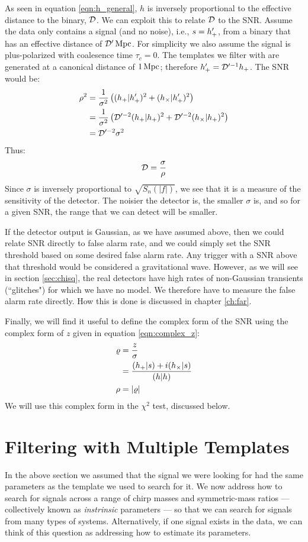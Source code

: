 As seen in equation \ref{eqn:h_general}, $h$ is inversely proportional to the effective distance to the binary, $\mathcal{D}$. We can exploit this to relate $\mathcal{D}$ to the \ac{SNR}. Assume the data only contains a signal (and no noise), i.e., $s = h'_{+}$, from a binary that has an effective distance of $\mathcal{D}'\,\mathrm{Mpc}$. For simplicity we also assume the signal is plus-polarized with coalesence time $\tau_c = 0$. The templates we filter with are generated at a canonical distance of $1\,\mathrm{Mpc}$; therefore $h'_{+} = \mathcal{D}'^{-1}h_{+}$. The \ac{SNR} would be:
\begin{align*}
\rho^2 &= \frac{1}{\sigma^2}\left( (h_{+}|h'_{+})^2 + (h_{\times}|h'_{+})^2 \right) \\
 &= \frac{1}{\sigma^2} \left( \mathcal{D}'^{-2}(h_{+}|h_{+})^2 + \mathcal{D}'^{-2}(h_{\times}|h_{+})^2 \right) \\
 &= \mathcal{D}'^{-2} \sigma^2
\end{align*}
Thus:
\begin{equation}
\label{eqn:DtoRho}
\effD = \frac{\sigma}{\rho}
\end{equation}
Since $\sigma$ is inversely proportional to $\sqrt{S_n(|f|)}$, we see that it is a measure of the sensitivity of the detector. The noisier the detector is, the smaller $\sigma$ is, and so for a given \ac{SNR}, the range that we can detect will be smaller.

If the detector output is Gaussian, as we have assumed above, then we could relate \ac{SNR} directly to false alarm rate, and we could simply set the \ac{SNR} threshold based on some desired false alarm rate. Any trigger with a \ac{SNR} above that threshold would be considered a gravitational wave. However, as we will see in section \ref{sec:chisq}, the real detectors have high rates of non-Gaussian transients (``glitches") for which we have no model. We therefore have to measure the false alarm rate directly. How this is done is discussed in chapter \ref{ch:far}.

Finally, we will find it useful to define the complex form of the \ac{SNR} using the complex form of $z$ given in equation \ref{eqn:complex_z}:
\begin{align}
\varrho &= \frac{z}{\sigma} \nonumber \\
 &= \frac{(h_{+}|s) + i(h_{\times}|s)}{(h|h)} \\
\rho &= |\varrho|
\end{align}
We will use this complex form in the $\chi^2$ test, discussed below.

\section{Filtering with Multiple Templates}
\label{sec:multiple_templates}
In the above section we assumed that the signal we were looking for had the same parameters as the template we used to search for it. We now address how to search for signals across a range of chirp masses and symmetric-mass ratios --- collectively known as \emph{instrinsic} parameters --- so that we can search for signals from many types of systems. Alternatively, if one signal exists in the data, we can think of this question as addressing how to estimate its parameters.

